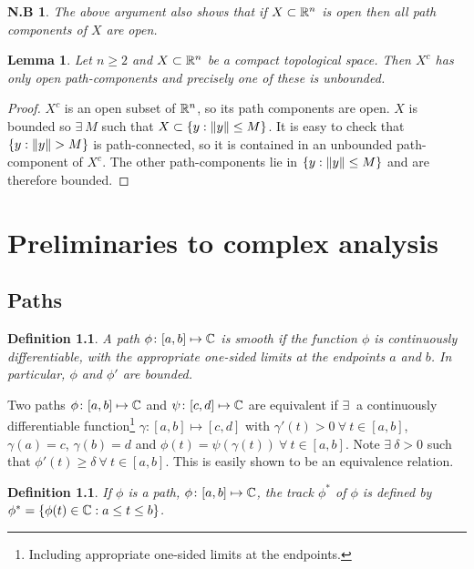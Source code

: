 \documentclass{notes}
\theoremstyle{plain}
\newtheorem{definition}[proposition]{Definition}
\newtheorem{lemma}[proposition]{Lemma}
\newtheorem*{notes}{N.B}
\begin{document}
\begin{notes}
The above argument also shows that if $X \subset \mathbb{R}^n$ is open then all
path components of $X$ are open.
\end{notes}

\begin{lemma}
Let $n \ge 2$ and $X \subset \mathbb{R}^n$ be a compact topological space.  Then
$X^c$ has only open path-components and precisely one of these is unbounded.
\end{lemma}

\begin{proof}
$X^c$ is an open subset of $\mathbb{R}^n$, so its path components are open.  $X$ is
bounded so $\exists\ M$ such that $X \subset \{ y : \left\|y\right\| \le M \}$.
It is easy to check that $\{ y : \left\|y\right\| > M \}$ is path-connected, so it is
contained in an unbounded path-component of $X^c$.  The other path-components
lie in $\{ y : \left\|y\right\| \le M \}$ and are therefore bounded.
\end{proof}

\chapter{Preliminaries to complex analysis}

\section{Paths}

\begin{definition}
A path $\phi \colon [a,b] \mapsto \mathbb{C}$ is smooth if the function
$\phi$ is continuously differentiable, with the appropriate one-sided limits
at the endpoints $a$ and $b$.  In particular, $\phi$ and $\phi'$ are bounded.
\end{definition}

Two paths $\phi \colon [a,b] \mapsto \mathbb{C}$ and $\psi \colon [c,d] \mapsto \mathbb{C}$ are
equivalent if $\exists\ $ a continuously differentiable 
{function}\footnote{Including appropriate one-sided limits at the endpoints.}
$\gamma \colon [a,b] \mapsto [c,d]$ with
$\gamma'(t) > 0\ \forall\ t \in [a,b]$, $\gamma(a) = c$, $\gamma(b) = d$
and $\phi(t) = \psi(\gamma(t))\ \forall\ t \in [a,b]$.  Note $\exists\ \delta
> 0$ such that $\phi'(t) \ge \delta\ \forall\ t \in [a,b]$.  This is easily
shown to be an equivalence relation.

\begin{definition}
If $\phi$ is a path, $\phi \colon [a,b] \mapsto \mathbb{C}$, the track
$\phi^*$ of $\phi$ is defined by
$\phi^* = \{ \phi(t) \in \mathbb{C} : a \le t \le b \}$.
\end{definition}
\end{document}
